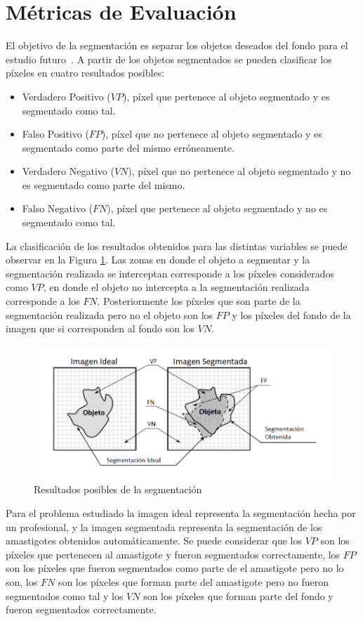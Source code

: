 \section{Métricas de Evaluación}
El objetivo de la segmentación es separar los objetos deseados del fondo para el estudio futuro~\cite{carrasco}. A partir de los objetos segmentados se pueden clasificar los píxeles en cuatro resultados posibles:
  
  
\begin{itemize}
\item Verdadero Positivo ($VP$), píxel que pertenece al objeto segmentado y es segmentado como tal.
\item Falso Positivo ($FP$), píxel que no pertenece al objeto segmentado y es segmentado como parte del mismo erróneamente.
\item Verdadero Negativo ($VN$), píxel que no pertenece al objeto segmentado y no es segmentado como parte del mismo.
\item Falso Negativo ($FN$), píxel que pertenece al objeto segmentado y no es segmentado como tal.
\end{itemize}
La clasificación de los resultados obtenidos para las distintas variables se puede observar en la Figura \ref{img:vpfp}. Las zonas en donde el objeto a segmentar y la segmentación realizada se interceptan corresponde a los píxeles considerados como $VP$, en donde el objeto no intercepta a la segmentación realizada corresponde a los $FN$. Posteriormente los píxeles que son parte de la segmentación realizada pero no el objeto son los $FP$ y los píxeles del fondo de la imagen que si corresponden al fondo son los $VN$.
\begin{figure}[H]
\centering
\includegraphics[width=160mm]{./imagenes/metricas-imagen.png}
\caption{Resultados posibles de la segmentación}
\label{img:vpfp}
\end{figure}
Para el problema estudiado la imagen ideal representa la segmentación hecha por un profesional, y la imagen segmentada representa la segmentación de los amastigotes obtenidos automáticamente. Se puede considerar que los $VP$ son los píxeles que pertenecen al amastigote y fueron segmentados correctamente, los $FP$ son los píxeles que fueron segmentados como parte de el amastigote pero no lo son, los $FN$ son los píxeles que forman parte del amastigote pero no fueron segmentados como tal y los $VN$ son los píxeles que forman parte del fondo y fueron segmentados correctamente.

